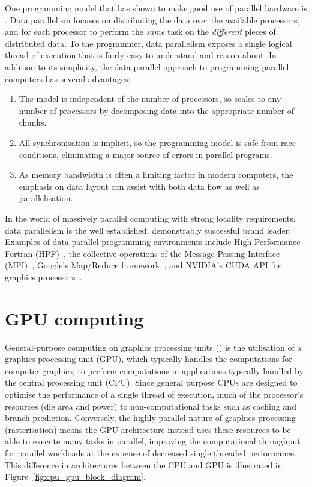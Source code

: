 One programming model that has shown to make good use of parallel hardware is
.
Data parallelism focuses on distributing the data over the available processors,
and for each processor to perform the \emph{same} task on the \emph{different}
pieces of distributed data. To the programmer, data parallelism exposes a single
logical thread of execution that is fairly easy to understand and reason about.
In addition to its simplicity, the data parallel approach to programming
parallel computers has several advantages:
%
\begin{enumerate}
\item The model is independent of the number of processors, so scales to any
    number of processors by decomposing data into the appropriate number of
    chunks.

\item All synchronisation is implicit, so the programming model is safe from
    race conditions, eliminating a major source of errors in parallel programs.

\item As memory bandwidth is often a limiting factor in modern computers, the
    emphasis on data layout can assist with both data flow as well as
    parallelisation.
\end{enumerate}
%
In the world of massively parallel computing with strong locality requirements,
data parallelism is the well established, demonstrably successful brand leader.
Examples of data parallel programming environments include High Performance
Fortran (HPF)~\cite{HPF:1997}, the collective operations of the Message Passing
Interface (MPI)~\cite{MPI:2012}, Google's Map/Reduce
framework~\cite{Dean:2008fi}, and NVIDIA's CUDA API for graphics
processors~\cite{NVIDIA:2012wf}.


\section{GPU computing} %
\label{sec:gpu_computing}

General-purpose computing on graphics processing units
() is the utilisation of a graphics processing unit (GPU),
which typically handles the computations for computer graphics, to perform
computations in applications typically handled by the central processing unit
(CPU). Since general purpose CPUs are designed to optimise the performance of a
single thread of execution, much of the processor's resources (die area and
power) to non-computational tasks such as caching and branch prediction.
Conversely, the highly parallel nature of graphics processing (rasterisation)
means the GPU architecture instead uses these resources to be able to execute
many tasks in parallel, improving the computational throughput for parallel
workloads at the expense of decreased single threaded performance. This
difference in architectures between the CPU and GPU is illustrated in
Figure~\ref{fig:cpu_gpu_block_diagram}.

